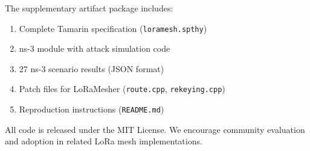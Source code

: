 \documentclass[10pt,journal]{IEEEtran}
\begin{document}
The supplementary artifact package includes:
\begin{enumerate}
	\item Complete Tamarin specification (\texttt{loramesh.spthy})
	\item ns-3 module with attack simulation code
	\item 27 ns-3 scenario results (JSON format)
	\item Patch files for LoRaMesher (\texttt{route.cpp}, \texttt{rekeying.cpp})
	\item Reproduction instructions (\texttt{README.md})
\end{enumerate}

All code is released under the MIT License. We encourage community evaluation and adoption in related LoRa mesh implementations.



\end{document}
